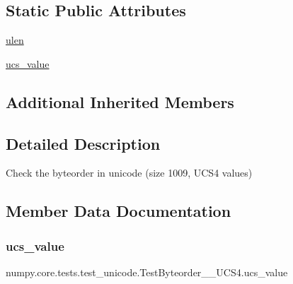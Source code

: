 \subsection*{Static Public Attributes}
\begin{DoxyCompactItemize}
\item 
\hyperlink{classnumpy_1_1core_1_1tests_1_1test__unicode_1_1TestByteorder__1009__UCS4_a917475290fa9a616b074bda49122934a}{ulen}
\item 
\hyperlink{classnumpy_1_1core_1_1tests_1_1test__unicode_1_1TestByteorder__1009__UCS4_a46699f205371c51389b0b9b150eec8ba}{ucs\+\_\+value}
\end{DoxyCompactItemize}
\subsection*{Additional Inherited Members}


\subsection{Detailed Description}
\begin{DoxyVerb}Check the byteorder in unicode (size 1009, UCS4 values)\end{DoxyVerb}
 

\subsection{Member Data Documentation}
\mbox{\label{classnumpy_1_1core_1_1tests_1_1test__unicode_1_1TestByteorder__1009__UCS4_a46699f205371c51389b0b9b150eec8ba}} 
\subsubsection{\texorpdfstring{ucs\+\_\+value}{ucs\_value}}
{\footnotesize\ttfamily numpy.\+core.\+tests.\+test\+\_\+unicode.\+Test\+Byteorder\+\_\+\_\+\+U\+C\+S4.\+ucs\+\_\+value\hspace{0.3cm}{\ttfamily [static]}}

